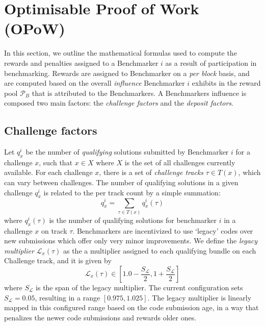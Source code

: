 \documentclass{contract}
\numberwithin{equation}{section}
\begin{document}
\makecontracttitle

\contracttableofcontents

\pagebreak
\section{Optimisable Proof of Work (OPoW)}

In this section, we outline the mathematical formulas used to compute the rewards and penalties assigned to a Benchmarker $i$ as a result of participation in benchmarking. 
Rewards are assigned to Benchmarker on a \emph{per block} basis, and are computed based on the overall \emph{influence} Benchmarker $i$ exhibits in the reward pool $\mathcal{P}_B$ that is attributed to the Benchmarkers. 
A Benchmarkers influence is composed two main factors: the \emph{challenge factors} and the \emph{deposit factors}.

\subsection{Challenge factors}
\label{sec:challenge-factors}

Let $q_x^i$ be the number of \emph{qualifying} solutions submitted by Benchmarker $i$ for a challenge $x$, such that $x\in X$ where $X$ is the set of all challenges currently available.
For each challenge $x$, there is a set of \emph{challenge tracks} $\tau \in T(x)$, which can vary between challenges. The number of qualifying solutions in a given challenge $q_x^i$ is related to the per track count by a simple summation:
\begin{equation}
	q_x^i = \sum\limits_{\tau \in T(x)}q^i_x(\tau)    
\end{equation}
where $q^i_x(\tau)$ is the number of qualifying solutions for benchmarker $i$ in a challenge $x$ on track $\tau$.
Benchmarkers are incentivized to use `legacy' codes over new submissions which offer only very minor improvements. 
We define the \emph{legacy multiplier} $\mathcal{L}_x(\tau)$ as the a multiplier assigned to each qualifying bundle on each Challenge track, and it is given by  
\begin{equation}
    \mathcal{L}_x(\tau) \in \left[ 1.0 - \frac{S_\mathcal{L}}{2}, 1+ \frac{S_\mathcal{L}}{2} \right]
\end{equation}
where $S_\mathcal{L}$ is the span of the legacy multiplier.
The current configuration sets $S_{\mathcal{L}} = 0.05$, resulting in a range $[0.975,1.025]$.
The legacy multiplier is linearly mapped in this configured range based on the code submission age, in a way that penalizes the newer code submissions and rewards older ones. 
\end{document}
